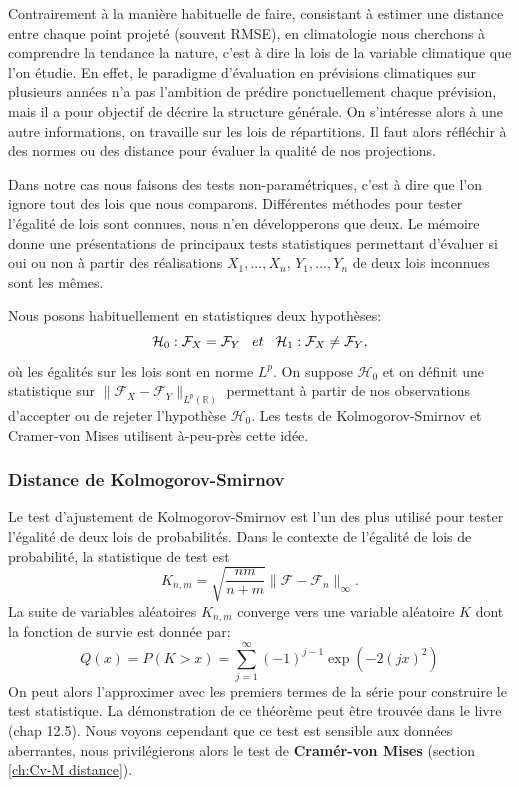 \documentclass[a4paper,11pt]{article}
\numberwithin{equation}{section}
\begin{document}
Contrairement à la manière habituelle de faire, consistant à estimer une distance entre chaque point projeté (souvent RMSE), en climatologie nous cherchons à comprendre la tendance la nature, c'est à dire la lois de la variable climatique que l'on étudie. En effet, le paradigme d'évaluation en prévisions climatiques sur plusieurs années n'a pas l'ambition de prédire ponctuellement chaque prévision, mais il a pour objectif de décrire la structure générale. On s'intéresse alors à une autre informations, on travaille sur les lois de répartitions. Il faut alors réfléchir à des normes ou des distance pour évaluer la qualité de nos projections.  

\vspace{0.7cm}

Dans notre cas nous faisons des tests non-paramétriques, c'est à dire que l'on ignore tout des lois que nous comparons.
Différentes méthodes pour tester l'égalité de lois sont connues, nous n'en développerons que deux. Le mémoire \cite{ethier2011propos} donne une présentations de principaux tests statistiques permettant d'évaluer si oui ou non à partir des réalisations $X_1,...,X_n$, $Y_1,...,Y_n$ de deux lois inconnues sont les mêmes. 

Nous posons habituellement en statistiques deux hypothèses:
\[ \mathcal{H}_0: \mathcal{F}_{X} = \mathcal{F}_{Y} \hspace{3mm} et \hspace{3mm} \mathcal{H}_1: \mathcal{F}_{X} \neq \mathcal{F}_{Y},\]
où les égalités sur les lois sont en norme $L^p$. On suppose $\mathcal{H}_0$ et on définit une statistique sur $\|\mathcal{F}_{X}-\mathcal{F}_{Y}\|_{L^p(\mathbb{R})}$ permettant à partir de nos observations d'accepter ou de rejeter l'hypothèse $\mathcal{H}_0$.
Les tests de Kolmogorov-Smirnov et Cramer-von Mises utilisent à-peu-près cette idée. 


\subsubsection{Distance de Kolmogorov-Smirnov}
\label{ch:Kolmogorov-Smirnov-distance}
Le test d'ajustement  de  Kolmogorov-Smirnov \cite{buning2002robustness} est  l'un des plus  utilisé pour tester l'égalité de deux lois  de probabilités. Dans  le  contexte de  l'égalité de lois  de probabilité, la statistique  de  test  est 
\[K_{n,m}= \sqrt{\frac{nm}{n+m}}\|\mathcal{F}-\mathcal{F}_n\|_{\infty}.\]
La suite de variables aléatoires $K_{n,m}$ converge vers une variable aléatoire $K$ dont la fonction de survie est donnée par: 
\begin{equation}
	Q(x)=P(K>x)=\sum_{j=1}^{\infty}(-1)^{j-1}\exp(-2(jx)^2)
\end{equation}
On peut alors l'approximer avec les premiers termes de la série pour construire le test statistique. La démonstration de ce théorème peut être trouvée dans le livre \cite{walker1965probability}(chap 12.5). Nous voyons cependant que ce test est sensible aux données aberrantes, nous privilégierons alors le test de \textbf{Cramér-von Mises} \cite{buning2002robustness} (section \ref{ch:Cv-M distance}).
\end{document}
